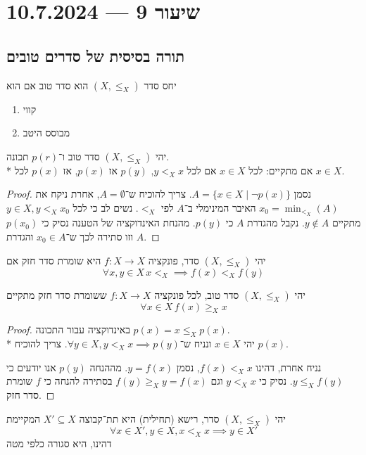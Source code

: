 \section{שיעור 9 --- 10.7.2024}
\subsection{תורה בסיסית של סדרים טובים}
\begin{definition}
	יחס סדר $(X, \le_X)$ הוא סדר טוב אם הוא
	\begin{enumerate}
		\item קווי
		\item מבוסס היטב
	\end{enumerate}
\end{definition}
\begin{theorem}
	יהי $(X, \le_X)$ סדר טוב ו־$p(r)$ תכונה. \\*
	אם מתקיים: לכל $x \in X$ אם לכל $y <_X x$, $p(y)$ אז $p(x)$, אז $p(x)$ לכל $x \in X$.
\end{theorem}
\begin{proof}
	נסמן $A = \{ x \in X \mid \lnot p(x) \}$.
	צריך להוכיח ש־$A = \emptyset$, אחרת ניקח את $x_0 = \min_{<_X}(A)$ האיבר המינימלי ב־$A$ לפי $<_X$.
	נשים לב כי לכל $y \in X, y <_X x_0$ מתקיים $y \notin A$.
	נקבל מהגדרת $A$ כי $p(y)$.
	מהנחת האינדוקציה של הטענה נסיק כי $p(x_0)$ וזו סתירה לכך ש־$x_0 \in A$ והגדרת $A$.
\end{proof}
\begin{definition}
	יהי $(X, \le_X)$ סדר, פונקציה $f : X \to X$ היא שומרת סדר חזק אם
	\[
		\forall x, y \in X \, x <_X \implies f(x) <_X f(y)
	\]
\end{definition}
\begin{proposition}
	יהי $(X, \le_X)$ סדר טוב, לכל פונקציה $f : X \to X$ ששומרת סדר חזק מתקיים
	\[
		\forall x \in X \, f(x) \ge_X x
	\]
\end{proposition}
\begin{proof}
	באינדוקציה עבור התכונה $p(x) = x \le_X p(x)$. \\*
	יהי $x \in X$ ונניח ש־$\forall y \in X, y <_X x \implies p(y)$.
	צריך להוכיח $p(x)$.

	נניח אחרת, דהינו $f(x) <_X x$, נסמן $y = f(x)$.
	מההנחה $p(y)$ אנו יודעים כי $y \le_X f(y)$.
	נסיק כי $y <_X x$ וגם $f(y) \ge_X y = f(x)$
	בסתירה להנחה כי $f$ שומרת סדר חזק.
\end{proof}
\begin{definition}[רישא]
	יהי $(X, \le_X)$ סדר, רישא (תחילית) היא תת־קבוצה $X' \subseteq X$ המקיימת
	\[
		\forall x \in X', y \in X, x <_X x \implies y \in X'
	\]
	דהינו, היא סגורה כלפי מטה
\end{definition}

